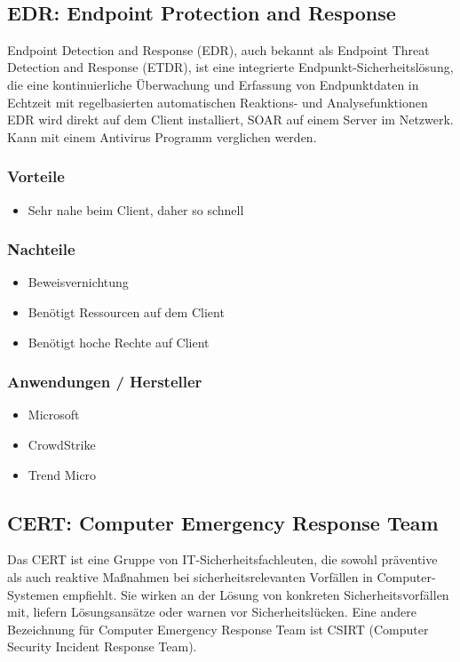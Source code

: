 \vfill
$ $
\columnbreak


\subsection{EDR: Endpoint Protection and Response}\label{subsec:edr}
Endpoint Detection and Response (EDR), auch bekannt als Endpoint Threat Detection and Response (ETDR), ist eine integrierte Endpunkt-Sicherheitslösung, die eine kontinuierliche Überwachung und Erfassung von Endpunktdaten in Echtzeit mit regelbasierten automatischen Reaktions- und Analysefunktionen
EDR wird direkt auf dem Client installiert, SOAR auf einem Server im Netzwerk. Kann mit einem Antivirus Programm verglichen werden.

\subsubsection{Vorteile}
\begin{itemize}
    \item Sehr nahe beim Client, daher so schnell
\end{itemize}

\subsubsection{Nachteile}
\begin{itemize}
    \item Beweisvernichtung
    \item Benötigt Ressourcen auf dem Client
    \item Benötigt hoche Rechte auf Client
\end{itemize}

\subsubsection{Anwendungen / Hersteller}
\begin{itemize}
    \item Microsoft
    \item CrowdStrike
    \item Trend Micro
\end{itemize}


\subsection{CERT: Computer Emergency Response Team}
Das CERT ist eine Gruppe von IT-Sicherheitsfachleuten, die sowohl präventive als auch reaktive Maßnahmen bei sicherheitsrelevanten Vorfällen in Computer-Systemen empfiehlt.
Sie wirken an der Lösung von konkreten Sicherheitsvorfällen mit, liefern Lösungsansätze oder warnen vor Sicherheitslücken.
Eine andere Bezeichnung für Computer Emergency Response Team ist CSIRT (Computer Security Incident Response Team).

